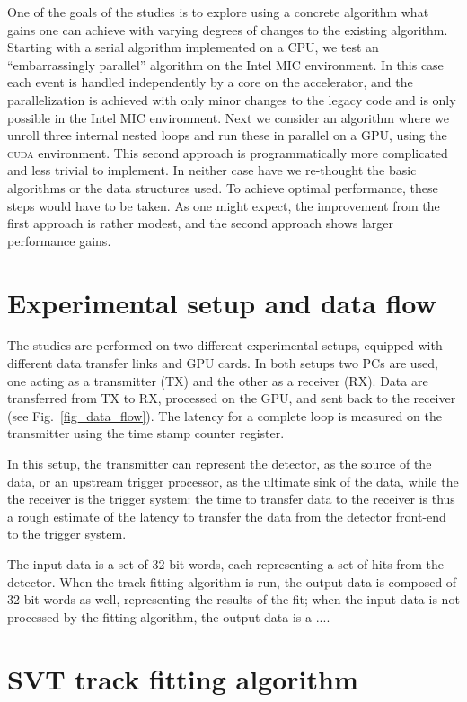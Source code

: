 \documentclass[letterpaper]{jpconf}
\begin{document}
One of the goals of the studies is to explore using a concrete
algorithm what gains one can achieve with varying degrees of changes
to the existing algorithm. Starting with a serial algorithm
implemented on a CPU, we test an ``embarrassingly parallel'' algorithm
on the Intel MIC environment. In this case each event is handled
independently by a core on the accelerator, and the parallelization is
achieved with only minor changes to the legacy code and is only
possible in the Intel MIC environment. Next we consider an algorithm
where we unroll three internal nested loops and run these in parallel
on a GPU, using the \textsc{cuda} environment. This second approach is
programmatically more complicated and less trivial to implement. In
neither case have we re-thought the basic algorithms or the data
structures used. To achieve optimal performance, these steps would
have to be taken.  As one might expect, the improvement from the first
approach is rather modest, and the second approach shows larger
performance gains.


\section{Experimental setup and data flow}
The studies are performed on two different experimental setups,
equipped with different data transfer links and GPU cards.  In both
setups two PCs are used, one acting as a transmitter (TX) and the
other as a receiver (RX).  Data are transferred from TX to RX,
processed on the GPU, and sent back to the receiver (see
Fig.~\ref{fig_data_flow}).  The latency for a complete loop is
measured on the transmitter using the time stamp counter register.

In this setup, the transmitter can represent the detector, as
the source of the data, or an upstream trigger processor, as
the ultimate sink of the data, while the the receiver is the
trigger system: the time to transfer data to the receiver is thus a
rough estimate of the latency to transfer the data from the detector
front-end to the trigger system.
 
The input data is a set of 32-bit words, each representing a set of
hits from the detector. When the track fitting algorithm is run, the
output data is composed of 32-bit words as well, representing the
results of the fit; when the input data is not processed by the
fitting algorithm, the output data is a .... 

\section{SVT track fitting algorithm}
\end{document}
